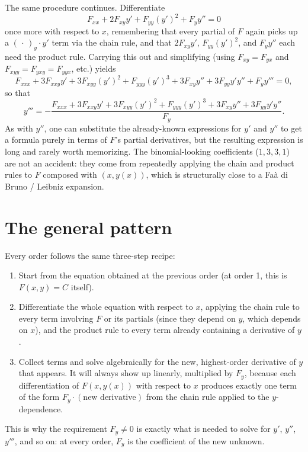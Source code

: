 \documentclass{essay}
\begin{document}
The same procedure continues. Differentiate
\[ F_{xx} + 2F_{xy}y' + F_{yy}(y')^{2} + F_{y} y'' = 0 \]
once more with respect to \(x\), remembering that every partial of \(F\) again picks up a
\((\,\cdot\,)_{y} \cdot y'\) term via the chain rule, and that \(2F_{xy}y'\), \(F_{yy}(y')^{2}\), and
\(F_{y} y''\) each need the product rule. Carrying this out and simplifying (using \(F_{xy} =
F_{yx}\) and \(F_{xyy} = F_{yxy} = F_{yyx}\), etc.) yields
\[ F_{xxx} + 3F_{xxy}y' + 3F_{xyy}(y')^{2} + F_{yyy}(y')^{3} + 3F_{xy}y'' + 3F_{yy}y'y'' + F_{y} y''' = 0, \]
so that
\[ y''' = -\frac{F_{xxx} + 3F_{xxy}y' + 3F_{xyy}(y')^{2} + F_{yyy}(y')^{3} + 3F_{xy}y'' + 3F_{yy}y'y''}{F_{y}}. \]
As with \(y''\), one can substitute the already-known expressions for \(y'\) and \(y''\) to get a
formula purely in terms of \(F\)'s partial derivatives, but the resulting expression is long
and rarely worth memorizing. The binomial-looking coefficients (\(1,3,3,1\)) are not an
accident: they come from repeatedly applying the chain and product rules to \(F\) composed
with \((x, y(x))\), which is structurally close to a Faà di Bruno / Leibniz expansion.

\section{The general pattern}

Every order follows the same three-step recipe:
\begin{enumerate}[label=(\arabic*)]
  \item Start from the equation obtained at the previous order (at order 1, this is
    \(F(x,y) = C\) itself).
  \item Differentiate the whole equation with respect to \(x\), applying the chain rule to every
    term involving \(F\) or its partials (since they depend on \(y\), which depends on \(x\)), and the
    product rule to every term already containing a derivative of \(y\).
  \item Collect terms and solve algebraically for the new, highest-order derivative of \(y\)
    that appears. It will always show up linearly, multiplied by \(F_{y}\), because each
    differentiation of \(F(x, y(x))\) with respect to \(x\) produces exactly one term of the form
    \(F_{y} \cdot (\text{new derivative})\) from the chain rule applied to the \(y\)-dependence.
\end{enumerate}
This is why the requirement \(F_{y} \neq 0\) is exactly what is needed to solve for \(y'\), \(y''\),
\(y'''\), and so on: at every order, \(F_{y}\) is the coefficient of the new unknown.
\end{document}
